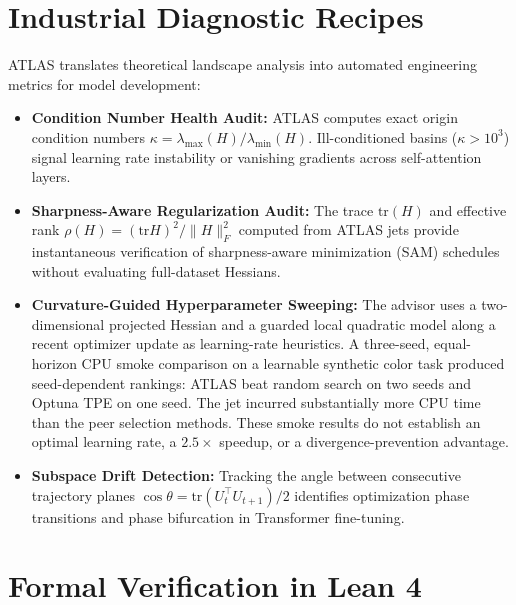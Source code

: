 \documentclass[11pt,a4paper]{article}
\theoremstyle{definition}
\theoremstyle{remark}
\begin{document}
\section{Industrial Diagnostic Recipes}

ATLAS translates theoretical landscape analysis into automated engineering metrics for model development:
\begin{itemize}
    \item \textbf{Condition Number Health Audit:} ATLAS computes exact origin condition numbers $\kappa = \lambda_{\max}(H) / \lambda_{\min}(H)$. Ill-conditioned basins ($\kappa > 10^3$) signal learning rate instability or vanishing gradients across self-attention layers.
    \item \textbf{Sharpness-Aware Regularization Audit:} The trace $\mathrm{tr}(H)$ and effective rank $\rho(H) = (\mathrm{tr} H)^2 / \|H\|_F^2$ computed from ATLAS jets provide instantaneous verification of sharpness-aware minimization (SAM) schedules without evaluating full-dataset Hessians.
    \item \textbf{Curvature-Guided Hyperparameter Sweeping:} The advisor uses a two-dimensional projected Hessian and a guarded local quadratic model along a recent optimizer update as learning-rate heuristics. A three-seed, equal-horizon CPU smoke comparison on a learnable synthetic color task produced seed-dependent rankings: ATLAS beat random search on two seeds and Optuna TPE on one seed. The jet incurred substantially more CPU time than the peer selection methods. These smoke results do not establish an optimal learning rate, a $2.5\times$ speedup, or a divergence-prevention advantage.
    \item \textbf{Subspace Drift Detection:} Tracking the angle between consecutive trajectory planes $\cos \theta = \mathrm{tr}(U_t^\top U_{t+1}) / 2$ identifies optimization phase transitions and phase bifurcation in Transformer fine-tuning.
\end{itemize}

\section{Formal Verification in Lean 4}
\end{document}

